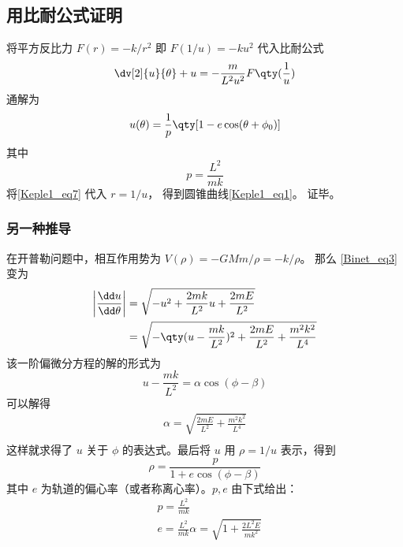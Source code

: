 \subsection{用比耐公式证明}

将平方反比力 $F(r) = -k/r^2$ 即 $F(1/u) = -ku^2$ 代入比耐公式
\begin{equation}
\dv[2]{u}{\theta} + u = -\frac{m}{L^2 u^2} F\qty(\frac 1u)
\end{equation}
通解为
\begin{equation}\label{Keple1_eq7}
u(\theta) = \frac{1}{p} \qty[1 - e\cos(\theta  + \phi_0)]
\end{equation}
其中
\begin{equation}
p = \frac{L^2}{mk}
\end{equation}
将\autoref{Keple1_eq7} 代入 $r = 1/u$， 得到圆锥曲线\autoref{Keple1_eq1}。 证毕。

\subsubsection{另一种推导}
在开普勒问题中，相互作用势为 $V(\rho)=-GMm/\rho=-k/\rho$。 那么 \autoref{Binet_eq3}~ 变为
\begin{equation}
\begin{aligned}
\left|\frac{\dd u}{\dd \theta}\right|&=\sqrt{-u^2+\frac{2m k}{L^2}u+\frac{2m E}{L^2}}\\
&=\sqrt{-\qty(u-\frac{m k}{L^2})^2+\frac{2m E}{L^2}+\frac{m^2 k^2}{L^4}}
\end{aligned}
\end{equation}
该一阶偏微分方程的解的形式为
\begin{equation}
u-\frac{m k}{L^2}=\alpha\cos(\phi-\beta)
\end{equation}
可以解得
\begin{equation}
\begin{aligned}
\alpha=\sqrt{\frac{2m E}{L^2}+\frac{m^2 k^2}{L^4}}\\
\end{aligned}
\end{equation}
这样就求得了 $u$ 关于 $\phi$ 的表达式。最后将 $u$ 用 $\rho=1/u$ 表示，得到
\begin{equation}
\rho=\frac{p}{1+e\cos(\phi-\beta)}
\end{equation}
其中 $e$ 为轨道的偏心率（或者称离心率）。$p,e$ 由下式给出：
\begin{equation}
\begin{aligned}
&p=\frac{L^2}{m k}\\
&e=\frac{L^2}{m k}\alpha=\sqrt{1+\frac{2L^2E}{m k^2}}
\end{aligned}
\end{equation}

